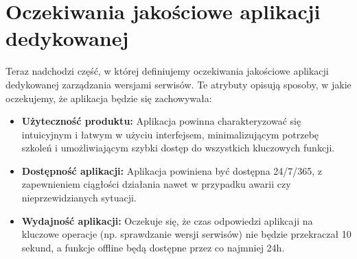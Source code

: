 \section{Oczekiwania jakościowe aplikacji dedykowanej}

Teraz nadchodzi część, w której definiujemy oczekiwania jakościowe aplikacji dedykowanej zarządzania wersjami serwisów. Te atrybuty opisują sposoby, w jakie oczekujemy, że aplikacja będzie się zachowywała:

\begin{itemize}
\item \textbf{Użyteczność produktu:} Aplikacja powinna charakteryzować się intuicyjnym i łatwym w użyciu interfejsem, minimalizującym potrzebę szkoleń i umożliwiającym szybki dostęp do wszystkich kluczowych funkcji.
\item \textbf{Dostępność aplikacji:} Aplikacja powiniena być dostępna 24/7/365, z zapewnieniem ciągłości działania nawet w przypadku awarii czy nieprzewidzianych sytuacji.
\item \textbf{Wydajność aplikacji:} Oczekuje się, że czas odpowiedzi aplikcaji na kluczowe operacje (np. sprawdzanie wersji serwisów) nie będzie przekraczał 10 sekund, a funkcje offline będą dostępne przez co najmniej 24h.
\end{itemize}

\clearpage